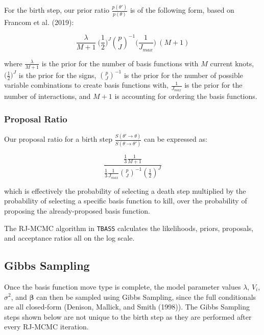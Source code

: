 \documentclass[
]{article}
\begin{document}
For the birth step, our prior ratio \(\frac{p(\theta')}{p(\theta)}\) is
of the following form, based on Francom et al. (2019):

\begin{equation}
\label{bprior}
\frac{\lambda}{M+1} ~\bigg(\frac{1}{2}\bigg)^{J} {p\choose J}^{-1} \bigg(\frac{1}{J_{max}}\bigg)~ (M+1)
\end{equation}

where \(\frac{\lambda}{M+1}\) is the prior for the number of basis
functions with \(M\) current knots, \(\big(\frac{1}{2}\big)^{J}\) is the
prior for the signs, \({p\choose J}^{-1}\) is the prior for the number
of possible variable combinations to create basis functions with,
\(\frac{1}{J_{max}}\) is the prior for the number of interactions, and
\(M+1\) is accounting for ordering the basis functions.

\hypertarget{proposal-ratio}{%
\subsubsection{Proposal Ratio}\label{proposal-ratio}}

Our proposal ratio for a birth step
\(\frac{S(\theta'\rightarrow\theta)}{S(\theta\rightarrow\theta')}\) can
be expressed as:

\begin{equation}
\label{bprop}
\frac{\frac{1}{3} \frac{1}{M+1}}{\frac{1}{3} \frac{1}{J_{max}} {p \choose J}^{-1} (\frac{1}{2})^{J}}
\end{equation}

which is effectively the probability of selecting a death step
multiplied by the probability of selecting a specific basis function to
kill, over the probability of proposing the already-proposed basis
function.

The RJ-MCMC algorithm in \texttt{TBASS} calculates the likelihoods,
priors, proposals, and acceptance ratios all on the log scale.

\hypertarget{gibbs-sampling}{%
\subsection{Gibbs Sampling}\label{gibbs-sampling}}

Once the basis function move type is complete, the model parameter
values \(\lambda\), \(V_i\), \(\sigma^2\), and \(\boldsymbol{\beta}\)
can then be sampled using Gibbs Sampling, since the full conditionals
are all closed-form (Denison, Mallick, and Smith (1998)). The Gibbs
Sampling steps shown below are not unique to the birth step as they are
performed after every RJ-MCMC iteration.
\end{document}
